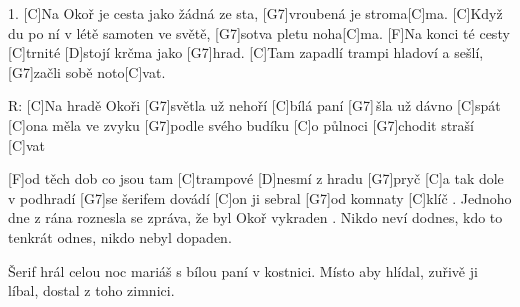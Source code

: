 
1. [C]Na Okoř je cesta jako žádná ze sta,
[G7]vroubená je stroma[C]ma.
[C]Když du po ní v létě samoten ve světě,
[G7]sotva pletu noha[C]ma. 
[F]Na konci té cesty [C]trnité
[D]stojí krčma jako [G7]hrad.
[C]Tam zapadlí trampi hladoví a sešlí,
[G7]začli sobě noto[C]vat.

R: [C]Na hradě Okoři [G7]světla už nehoří 
[C]bílá paní [G7]\,šla už dávno [C]spát 
[C]ona měla ve zvyku [G7]podle svého budíku 
[C]o půlnoci [G7]chodit straší [C]vat 

[F]od těch dob co jsou tam [C]trampové 
[D]nesmí z hradu [G7]pryč 
[C]a tak dole v podhradí [G7]se šerifem dovádí 
[C]on ji sebral [G7]od komnaty [C]klíč 
. Jednoho dne z rána roznesla se zpráva, 
že byl Okoř vykraden .
Nikdo neví dodnes, kdo to tenkrát odnes,
nikdo nebyl dopaden.

Šerif hrál celou noc mariáš 
s bílou paní v kostnici. 
Místo aby hlídal, zuřivě ji líbal,
dostal z toho zimnici.
